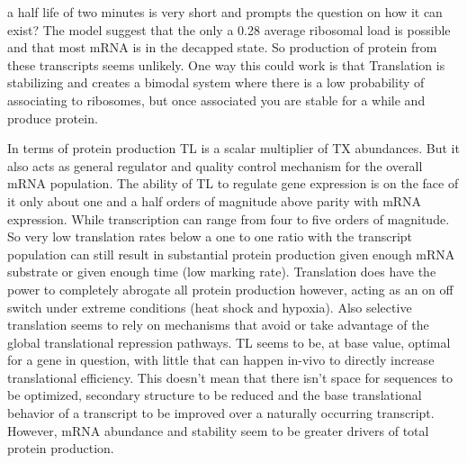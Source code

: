 \documentclass[review]{elsarticle}
\begin{document}
a half life of two minutes is very short and prompts the question on how it can exist? The model suggest that the only a 0.28 average ribosomal load is possible and that most mRNA is in the decapped state. So production of protein from these transcripts seems unlikely. One way this could work is that Translation is stabilizing and creates a bimodal system where there is a low probability of associating to ribosomes, but once associated you are stable for a while and produce protein. 




In terms of protein production TL is a scalar multiplier of TX abundances. But it also acts as general regulator and quality control mechanism for the overall mRNA population. The ability of TL to regulate gene expression is on the face of it only about one and a half orders of magnitude above parity with mRNA expression. While transcription can range from four to five orders of magnitude. So very low translation rates below a one to one ratio with the transcript population can still result in substantial protein production given enough mRNA substrate or given enough time (low marking rate). Translation does have the power to completely abrogate all protein production however, acting as an on off switch under extreme conditions (heat shock and hypoxia). Also selective translation seems to rely on mechanisms that avoid or take advantage of the global translational repression pathways. TL seems to be, at base value, optimal for a gene in question, with little that can happen in-vivo to directly increase translational efficiency. This doesn't mean that there isn't space for sequences to be optimized, secondary structure to be reduced and the base translational behavior of a transcript to be improved over a naturally occurring transcript. However, mRNA abundance and stability seem to be greater drivers of total protein production. 






\end{document}
